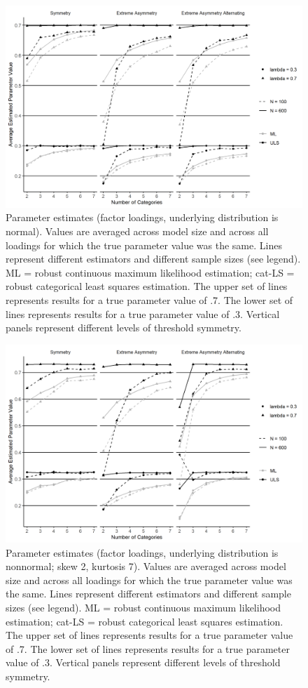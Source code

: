 \documentclass[10,a4paperpaper,]{article}
\begin{document}
\begin{figure}
\includegraphics[width=445pt]{./figures/fig_3} \caption{Parameter estimates (factor loadings, underlying distribution is normal). Values are averaged across model size and across all loadings for which the true parameter value was the same. Lines represent different estimators and different sample sizes (see legend). ML = robust continuous maximum likelihood estimation; cat-LS = robust categorical least squares estimation. The upper set of lines represents results for a true parameter value of .7. The lower set of lines represents results for a true parameter value of .3. Vertical panels represent different levels of threshold symmetry.}\label{fig:unnamed-chunk-2}
\end{figure}

\begin{figure}
\includegraphics[width=445pt]{./figures/fig_4} \caption{Parameter estimates (factor loadings, underlying distribution is nonnormal; skew 2, kurtosis 7). Values are averaged across model size and across all loadings for which the true parameter value was the same. Lines represent different estimators and different sample sizes (see legend). ML = robust continuous maximum likelihood estimation; cat-LS = robust categorical least squares estimation. The upper set of lines represents results for a true parameter value of .7. The lower set of lines represents results for a true parameter value of .3. Vertical panels represent different levels of threshold symmetry.}\label{fig:unnamed-chunk-3}
\end{figure}
\end{document}
